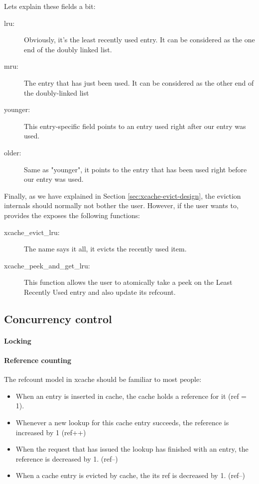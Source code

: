 
Lets explain these fields a bit:

\begin{description}
	\item[lru:] Obviously, it's the least recently used entry. It can be 
		considered as the one end of the doubly linked list.
	\item[mru:] The entry that has just been used. It can be considered as 
		the other end of the doubly-linked list
	\item[younger:] This entry-specific field points to an entry used right 
		after our entry was used.
	\item[older:] Same as "younger", it points to the entry that has been 
		used right before our entry was used.
\end{description}

Finally, as we have explained in Section \ref{sec:xcache-evict-design}, the 
eviction internals should normally not bother the user. However, if the user 
wants to, \xcache provides the exposes the following functions:

\begin{description}
	\item[xcache\_evict\_lru:] The name says it all, it evicts the recently 
		used item.
	\item[xcache\_peek\_and\_get\_lru:] This function allows the user to 
		atomically take a peek on the Least Recently Used entry and also 
		update its refcount.
\end{description}

\subsection{Concurrency control}\label{sec:conc-imp}

\paragraph{Locking}\label{par:lock}

\paragraph{Reference counting}\label{par:refcount-imp}

The refcount model in xcache should be familiar to most people:

\begin{itemize}
	\item When an entry is inserted in cache, the cache holds a reference 
		for it (ref = 1).
	\item Whenever a new lookup for this cache entry succeeds, the reference 
		is increased by 1 (ref++)
	\item When the request that has issued the lookup has finished with an 
		entry, the reference is decreased by 1. (ref--)
	\item When a cache entry is evicted by cache, the its ref is decreased 
		by 1. (ref--)
\end{itemize}

